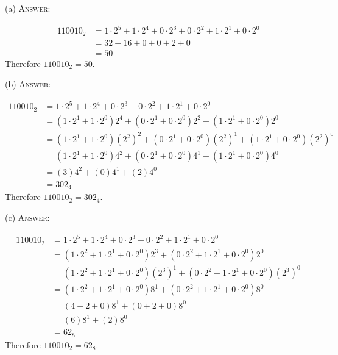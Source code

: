 (a)
\textsc{Answer:}\vspace{-2mm}
\begin{answerlong}
\begin{align*}
110010_2 &= 1 \cdot 2^{5} + 1\cdot 2^{4} + 0 \cdot 2^{3} + 0\cdot 2^{2} + 1\cdot 2^{1} + 0\cdot 2^{0} \\
         &= 32 + 16 + 0 + 0 + 2 + 0 \\
         &= 50
\end{align*}
Therefore $110010_{2} = 50$.
\end{answerlong}

(b)
\textsc{Answer:}\vspace{-2mm}
\begin{answerlong}
\begin{align*}
110010_2 &= 1 \cdot 2^{5} + 1\cdot 2^{4} + 0 \cdot 2^{3} + 0\cdot 2^{2} + 1 \cdot 2^{1} + 0\cdot 2^{0} \\
         &= (1 \cdot 2^{1} + 1\cdot 2^{0})2^{4} + (0 \cdot 2^{1} + 0\cdot 2^{0})2^{2} +(1 \cdot 2^{1} + 0\cdot 2^{0}) 2^{0} \\
         &= (1 \cdot 2^{1} + 1\cdot 2^{0})(2^{2})^{2} + (0 \cdot 2^{1} + 0\cdot 2^{0})(2^{2})^{1} +(1 \cdot 2^{1} + 0\cdot 2^{0})(2^{2})^{0}  \\
         &= (1 \cdot 2^{1} + 1\cdot 2^{0})4^{2} + (0 \cdot 2^{1} + 0\cdot 2^{0})4^{1} +(1 \cdot 2^{1} + 0\cdot 2^{0})4^{0} \\
         &= (3)4^{2} + (0)4^{1} + (2)4^{0} \\
         &= 302_{4}
\end{align*}
Therefore $110010_{2} = 302_{4}$.
\end{answerlong}

(c)
\textsc{Answer:}\vspace{-2mm}
\begin{answerlong}
\begin{align*}
110010_2 &= 1 \cdot 2^{5} + 1\cdot 2^{4} + 0 \cdot 2^{3} + 0\cdot 2^{2} + 1 \cdot 2^{1} + 0\cdot 2^{0} \\
         &= (1 \cdot 2^{2} + 1\cdot 2^{1} + 0 \cdot 2^{0})2^{3} + (0\cdot 2^{2} + 1 \cdot 2^{1} + 0\cdot 2^{0})2^{0} \\
         &= (1 \cdot 2^{2} + 1\cdot 2^{1} + 0 \cdot 2^{0})(2^{3})^{1} + (0\cdot 2^{2} + 1 \cdot 2^{1} + 0\cdot 2^{0})(2^{3})^{0} \\
         &= (1 \cdot 2^{2} + 1\cdot 2^{1} + 0 \cdot 2^{0})8^{1} + (0\cdot 2^{2} + 1 \cdot 2^{1} + 0\cdot 2^{0})8^{0} \\
         &= (4 + 2 + 0)8^{1} + (0 + 2 + 0)8^{0} \\
         &= (6)8^{1} + (2)8^{0}\\
         &= 62_{8}
\end{align*}
Therefore $110010_2 = 62_{8}$.
\end{answerlong}

